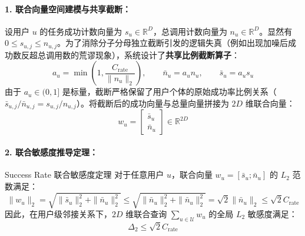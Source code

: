 \paragraph{1. 联合向量空间建模与共享截断：}
设用户 $u$ 的任务成功计数向量为 $s_u \in \mathbb{R}^D$，总调用计数向量为 $n_u \in \mathbb{R}^D$。显然有 $0 \le s_{u, j} \le n_{u, j}$。为了消除分子分母独立截断引发的逻辑失真（例如出现加噪后成功数反超总调用数的荒谬现象），系统设计了\textbf{共享比例截断算子}：
\begin{equation}
  a_u = \min\left(1, \frac{C_{\text{rate}}}{\|n_u\|_2}\right), \qquad \bar{n}_u = a_u n_u, \qquad \bar{s}_u = a_u s_u
\end{equation}
由于 $a_u \in (0, 1]$ 是标量，截断严格保留了用户个体的原始成功率比例关系（$\bar{s}_{u, j} / \bar{n}_{u, j} = s_{u, j} / n_{u, j}$）。将截断后的成功向量与总量向量拼接为 $2D$ 维联合向量：
\begin{equation}
  w_u = \begin{bmatrix} \bar{s}_u \\ \bar{n}_u \end{bmatrix} \in \mathbb{R}^{2D}
\end{equation}

\paragraph{2. 联合敏感度推导定理：}
\begin{techbox}{Success Rate 联合敏感度定理}
对于任意用户 $u$，联合向量 $w_u = [\bar{s}_u ; \bar{n}_u]$ 的 $L_2$ 范数满足：
\begin{equation}
  \|w_u\|_2 = \sqrt{\|\bar{s}_u\|_2^2 + \|\bar{n}_u\|_2^2} \le \sqrt{\|\bar{n}_u\|_2^2 + \|\bar{n}_u\|_2^2} = \sqrt{2}\|\bar{n}_u\|_2 \le \sqrt{2} C_{\text{rate}}
\end{equation}
因此，在用户级邻接关系下，$2D$ 维联合查询 $\sum_{u \in \mathcal{U}} w_u$ 的全局 $L_2$ 敏感度满足：
\begin{equation}
  \Delta_2 \le \sqrt{2} C_{\text{rate}}
\end{equation}
\end{techbox}

